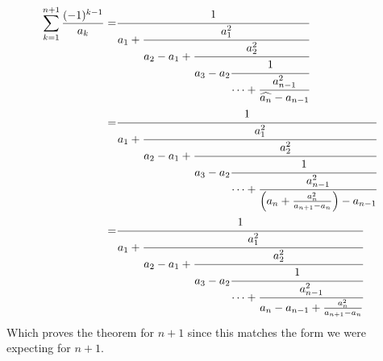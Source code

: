 \documentclass[a4paper]{article}
\begin{document}
\begin{theorem}
        \begin{align*}
            \sum_{k=1}^{n+1} \frac{(-1)^{k-1}}{a_k} =& \cfrac{1}{a_1+\cfrac{a_{1}^{2}}{a_2 - a_1 +\cfrac{a_2^2}{a_3 - a_2
            \cfrac{1}{\cdots + \cfrac{a_{n-1}^2}{\widehat{a_n} - a_{n-1}}}}}}
            \\
            =& \cfrac{1}{a_1+\cfrac{a_{1}^{2}}{a_2 - a_1 +\cfrac{a_2^2}{a_3 - a_2
            \cfrac{1}{\cdots + \cfrac{a_{n-1}^2}{\Big( a_{n} + \frac{a_n^2}{a_{n+1} - a_{n}} \Big) - a_{n-1}}}}}}
            \\
            =& \cfrac{1}{a_1+\cfrac{a_{1}^{2}}{a_2 - a_1 +\cfrac{a_2^2}{a_3 - a_2
            \cfrac{1}{\cdots + \cfrac{a_{n-1}^2}{a_{n} - a_{n-1} + \frac{a_n^2}{a_{n+1} - a_{n}} }}}}}
        \end{align*}
        Which proves the theorem for $n+1$ since this matches the form we were expecting for $n+1$.

    \end{theorem}
\end{document}
